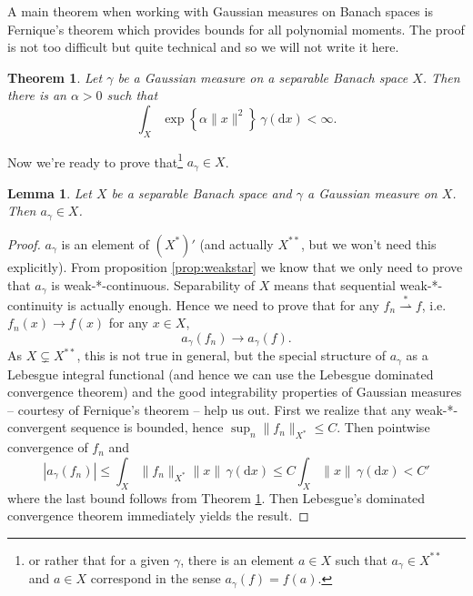 \documentclass{scrartcl}
\newtheorem{lemma}{Lemma}
\newtheorem{theorem}{Theorem}
\theoremstyle{definition}
\theoremstyle{remark}
\newcommand{\de}{\mathrm d}
\begin{document}
A main theorem when working with Gaussian measures on Banach spaces is Fernique's theorem which provides bounds for all polynomial moments. The proof is not too difficult but quite technical and so we will not write it here.
\begin{theorem}\label{thm:fernique}
Let $\gamma$ be a Gaussian measure on a separable Banach space $X$. Then there is an $\alpha > 0$ such that
\[\int_X \exp\left\{\alpha \|x\|^2\right\}\,\gamma(\de x) < \infty. \]
\end{theorem}
Now we're ready to prove that\footnote{or rather that for a given $\gamma$, there is an element $a\in X$ such that $a_\gamma\in X^{**}$ and $a\in X$ correspond in the sense $a_\gamma(f) = f(a)$.} $a_\gamma \in X$.
\begin{lemma}\label{lem:agamma}
Let $X$ be a separable Banach space and $\gamma$ a Gaussian measure on $X$. Then $a_\gamma \in X$.
\end{lemma}
\begin{proof}
$a_\gamma$ is an element of $(X^*)'$ (and actually $X^{**}$, but we won't need this explicitly). From proposition \ref{prop:weakstar} we know that we only need to prove that $a_\gamma$ is weak-*-continuous. Separability of $X$ means that sequential weak-*-continuity is actually enough. Hence we need to prove that for any $f_n \stackrel{*}{\rightharpoonup} f$, i.e. $f_n(x)\to f(x)$ for any $x\in X$, 
\[ a_\gamma(f_n) \to a_\gamma(f). \]
As $X\subsetneq X^{**}$, this is not true in general, but the special structure of $a_\gamma$ as a Lebesgue integral functional (and hence we can use the Lebesgue dominated convergence theorem) and the good integrability properties of Gaussian measures -- courtesy of Fernique's theorem -- help us out. First we realize that any weak-*-convergent sequence is bounded, hence $\sup_n\|f_n\|_{X^*}  \leq C$. Then pointwise convergence of $f_n$ and 
\[ |a_\gamma(f_n)| \leq \int_X \|f_n\|_{X^*} \|x\|\,\gamma(\de x) \leq C \int_X \|x\|\,\gamma( \de x) < C' \]
where the last bound follows from Theorem \ref{thm:fernique}. Then Lebesgue's dominated convergence theorem immediately yields the result.
\end{proof}
\end{document}
